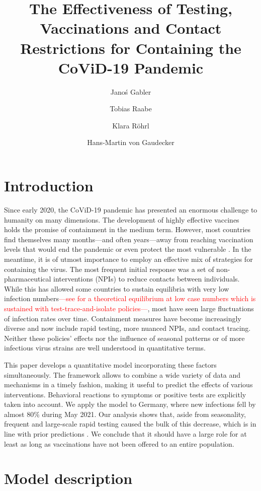 \documentclass[fleqn,10pt]{wlscirep}
\title{
    The Effectiveness of Testing, Vaccinations and Contact Restrictions for Containing
    the CoViD-19 Pandemic
}
\author[1, 2]{Janoś Gabler}
\author[3]{Tobias Raabe}
\author[1]{Klara Röhrl}
\author[2, 4, *]{Hans-Martin von Gaudecker}
\affil[1]{Bonn Graduate School of Economics, Bonn, 53113, Germany}
\affil[2]{IZA Institute of Labor Economics, Bonn, 53113, Germany}
\affil[3]{Private sector}
\affil[4]{Rheinische Friedrich-Wilhelms-Universität Bonn, Bonn, 53113, Germany}
\affil[*]{hmgaudecker@uni-bonn.de}
\begin{document}
\flushbottom
\maketitle
\thispagestyle{empty}

\section*{Introduction}

Since early 2020, the CoViD-19 pandemic has presented an enormous challenge to humanity
on many dimensions. The development of highly effective vaccines holds the promise of
containment in the medium term. However, most countries find themselves many
months---and often years---away from reaching vaccination levels that would end the
pandemic or even protect the most vulnerable \cite{Mathieu2021}. In the meantime, it is
of utmost importance to employ an effective mix of strategies for containing the virus.
The most frequent initial response was a set of non-pharmaceutical interventions (NPIs)
to reduce contacts between individuals. While this has allowed some countries to sustain
equilibria with very low infection numbers\textcolor{red}{---see \cite{Contreras2021}
for a theoretical equilibrium at low case numbers which is sustained with
test-trace-and-isolate policies---}, most have seen large fluctuations of infection
rates over time. Containment measures have become increasingly diverse and now include
rapid testing, more nuanced NPIs, and contact tracing. Neither these policies' effects
nor the influence of seasonal patterns or of more infectious virus strains are well
understood in quantitative terms.

This paper develops a quantitative model incorporating these factors simultaneously. The
framework allows to combine a wide variety of data and mechanisms in a timely fashion,
making it useful to predict the effects of various interventions. Behavioral reactions
to symptoms or positive tests are explicitly taken into account. We apply the model to
Germany, where new infections fell by almost 80\% during May 2021. Our analysis shows
that, aside from seasonality, frequent and large-scale rapid testing caused the bulk of
this decrease, which is in line with prior predictions \cite{Mina2021}. We conclude
that it should have a large role for at least as long as vaccinations have not been
offered to an entire population.

\section{Model description}
\end{document}
